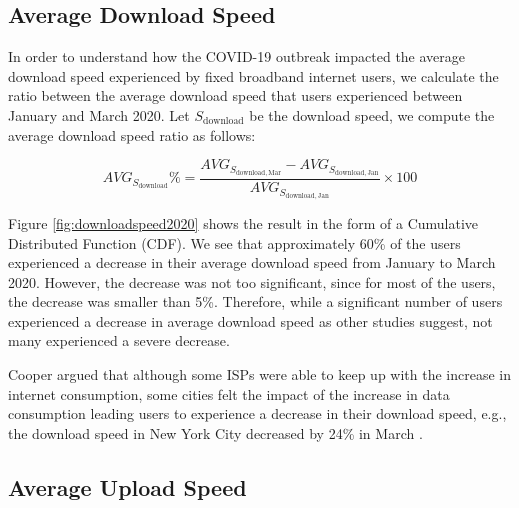 \documentclass[conference,10pt]{IEEEtran}
\begin{document}
\subsection{Average Download Speed}
\label{sec:average-download-speed}

In order to understand how the COVID-19 outbreak impacted the average download speed experienced by fixed broadband internet users, we calculate the ratio between the average download speed that users experienced between January and March 2020. Let $S_{\text{download}}$ be the download speed, we compute the average download speed ratio as follows:

\begin{equation}
AVG_{S_{\text{download}}}\% = \frac{AVG_{S_{\text{download},\, \text{Mar}}}-AVG_{S_{\text{download},\, \text{Jan}}}}{AVG_{S_{\text{download},\, \text{Jan}}}}\times 100
\end{equation}


Figure \ref{fig:downloadspeed2020} shows the result in the form of a Cumulative Distributed Function (CDF). We see that approximately 60\% of the users experienced a decrease in their average download speed from January to March 2020. However, the decrease was not too significant, since for most of the users, the decrease was smaller than 5\%. Therefore, while a significant number of users experienced a decrease in average download speed as other studies suggest, not many experienced a severe decrease.

Cooper argued that although some ISPs were able to keep up with the increase in internet consumption, some cities felt the impact of the increase in data consumption leading users to experience a decrease in their download speed, e.g., the download speed in New York City decreased by 24\% in March \cite{cooper}.


\subsection{Average Upload Speed}
\label{sec:average-upload-speed}
\end{document}
